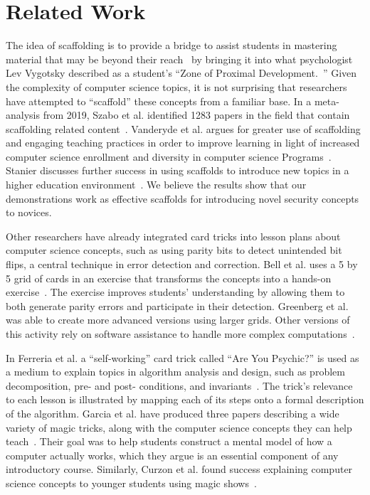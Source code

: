 \section{Related Work}
\label{SEC:related-work}

The idea of scaffolding is to provide a bridge to assist students
in mastering material that may be beyond their reach~\cite{wood1976role}
by bringing it into what psychologist Lev Vygotsky described as a student's
``Zone of Proximal Development.~\cite{vygotsky1978}''  Given the complexity of computer science
topics, it is not surprising that researchers have attempted to ``scaffold''
these concepts from a familiar base.  In a meta-analysis from 2019, Szabo et al.
identified 1283 papers in the field that contain scaffolding related
content~\cite{szabometa}.
Vanderyde et al. argues for greater use of scaffolding and engaging teaching
practices in order to improve learning in light of increased computer science
enrollment and diversity in computer science
Programs~\cite{vanderhydescaffolding}.  Stanier discusses
further success in using scaffolds to introduce new topics in a higher education
environment~\cite{stanierhighered}.
We believe the results show that our demonstrations work as
effective scaffolds for introducing novel security concepts to novices.

Other researchers have already integrated card tricks into lesson plans about
computer science concepts, such as using parity bits to detect unintended bit
flips, a central technique in error detection and correction.  Bell et al. uses a
5 by 5 grid of cards in an exercise that transforms the concepts into a hands-on
exercise~\cite{bell2009computer, csunplugged}.
The exercise improves students' understanding by allowing them to
both generate parity errors and participate in their detection.  Greenberg et
al. was able to create more advanced versions using larger grids.  Other versions
of this activity rely on software assistance to handle more complex
computations~\cite{Greenberg2017, Greenberg2018}.

In Ferreria et al. a ``self-working'' card trick called ``Are You Psychic?''
is used
as a medium to explain topics in algorithm analysis and design, such as problem
decomposition, pre- and post- conditions, and
invariants~\cite{ferreira2014magic}.
The trick's relevance
to each lesson is illustrated by mapping each of its steps onto a formal
description of the algorithm.  Garcia et al. have produced three papers describing
a wide variety of magic tricks, along with the computer science concepts they
can help teach~\cite{garcia2012demystifying,
garcia2013demystifying,
garcia2016demystifying}.
Their goal was to help students construct a mental model of how
a computer actually works, which they argue is an essential component of any
introductory course.  Similarly, Curzon et al. found success explaining computer
science concepts to younger students using magic shows~\cite{curzon2008engaging}.


